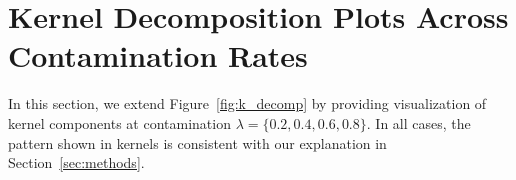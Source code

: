 \section{Kernel Decomposition Plots Across Contamination Rates}
\label{apdx:more_kernels}
In this section, we extend Figure~\ref{fig:k_decomp} by providing visualization of kernel components at contamination $\lambda = \{0.2, 0.4, 0.6, 0.8\}$.
In all cases, the pattern shown in kernels is consistent with our explanation in Section~\ref{sec:methods}.


\clearpage
